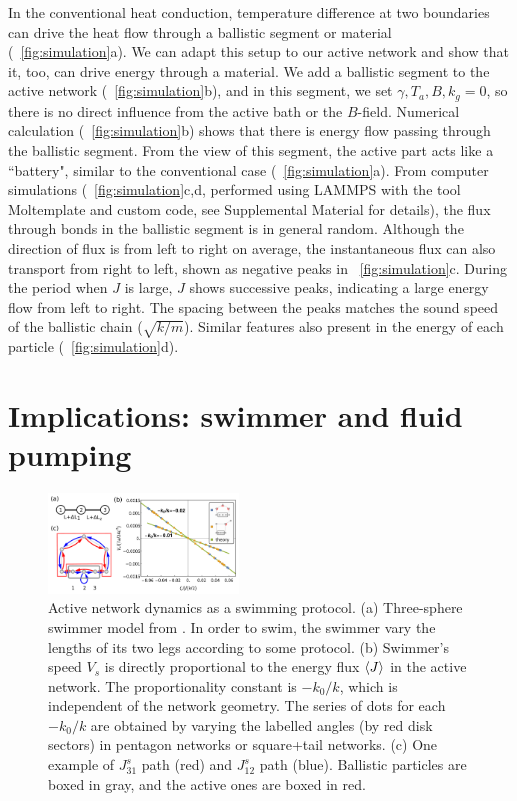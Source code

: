 \documentclass[
 preprint,
 preprintnumbers,
 amsmath,amssymb,
 aps,
 pre,
 longbibliography,
 10pt, twocolumn
]{revtex4-1}
\begin{document}
In the conventional heat conduction, temperature difference at two boundaries can drive the heat flow through a ballistic segment or material (\figurename~\ref{fig:simulation}a).
We can adapt this setup to our active network and show that it, too, can drive energy through a material.
We add a ballistic segment to the active network (\figurename~\ref{fig:simulation}b), and in this segment, we set $\gamma,T_a,B,k_g=0$, so there is no direct influence from the active bath or the $B$-field.
Numerical calculation (\figurename~\ref{fig:simulation}b) shows that there is energy flow passing through the ballistic segment. From the view of this segment, the active part acts like a ``battery", similar to the conventional case (\figurename~\ref{fig:simulation}a).
From computer simulations (\figurename~\ref{fig:simulation}c,d, performed using LAMMPS \cite{Plimpton1995FastDynamics} with the tool Moltemplate \cite{Jewett2013MoltemplateTool} and custom code, see Supplemental Material for details), the flux through bonds in the ballistic segment is in general random. Although the direction of flux is from left to right on average, the instantaneous flux can also transport from right to left, shown as negative peaks in \figurename~\ref{fig:simulation}c. During the period when $J$ is large, $J$ shows successive peaks, indicating a large energy flow from left to right. The spacing between the peaks matches the sound speed of the ballistic chain ($\sqrt{k/m}$).  Similar features also present in the energy of each particle (\figurename~\ref{fig:simulation}d).


\section{Implications: swimmer and fluid pumping} \label{sec:swimmer}

\begin{figure}[ht]
	\centering
	\includegraphics[width=0.45\textwidth]{7_swimmer.pdf}
    \caption{Active network dynamics as a swimming protocol.
    (a) Three-sphere swimmer model from \cite{Golestanian2008AnalyticNumber}. In order to swim, the swimmer vary the lengths of its two legs according to some protocol.
    (b) Swimmer's speed $V_s$ is directly proportional to the energy flux $\expval{J}$ in the active network. The proportionality constant is $-k_0/k$, which is independent of the network geometry. The series of dots for each $-k_0/k$ are obtained by varying the labelled angles (by red disk sectors) in pentagon networks or square+tail networks.
    (c) One example of $J_{31}^s$ path (red) and $J_{12}^s$ path (blue). Ballistic particles are boxed in gray, and the active ones are boxed in red.
    }
    \label{fig:swimmer}
\end{figure}
\end{document}
